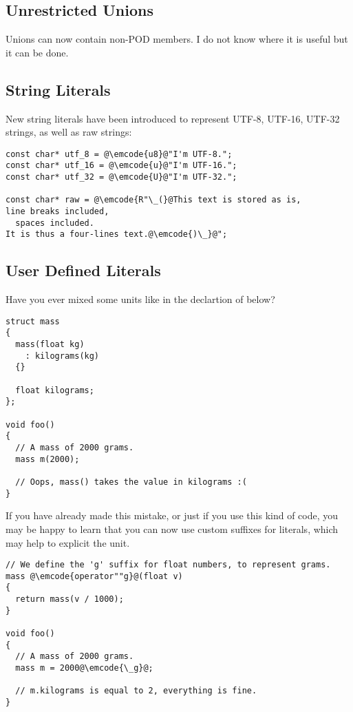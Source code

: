\subsection{Unrestricted Unions}

Unions can now contain non-POD members. I do not know where it is
useful but it can be done.

\subsection{String Literals}

New string literals have been introduced to represent UTF-8, UTF-16,
UTF-32 strings, as well as raw strings:

\begin{lstlisting}
const char* utf_8 = @\emcode{u8}@"I'm UTF-8.";
const char* utf_16 = @\emcode{u}@"I'm UTF-16.";
const char* utf_32 = @\emcode{U}@"I'm UTF-32.";

const char* raw = @\emcode{R"\_(}@This text is stored as is,
line breaks included,
  spaces included.
It is thus a four-lines text.@\emcode{)\_}@";
\end{lstlisting}

\subsection{User Defined Literals}

Have you ever mixed some units like in the declartion of  below?

\begin{lstlisting}
struct mass
{
  mass(float kg)
    : kilograms(kg)
  {}

  float kilograms;
};

void foo()
{
  // A mass of 2000 grams.
  mass m(2000);

  // Oops, mass() takes the value in kilograms :(
}
\end{lstlisting}

If you have already made this mistake, or just if you use this kind of
code, you may be happy to learn that you can now use custom suffixes
for literals, which may help to explicit the unit.

\begin{lstlisting}
// We define the 'g' suffix for float numbers, to represent grams.
mass @\emcode{operator""g}@(float v)
{
  return mass(v / 1000);
}

void foo()
{
  // A mass of 2000 grams.
  mass m = 2000@\emcode{\_g}@;

  // m.kilograms is equal to 2, everything is fine.
}
\end{lstlisting}

